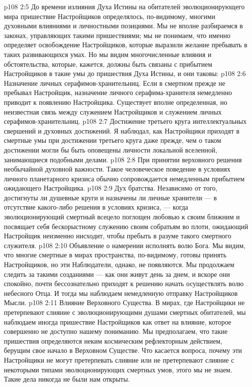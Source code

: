\vs p108 2:5 До времени излияния Духа Истины на обитателей эволюционирующего мира пришествие Настройщиков определялось, по\hyp{}видимому, многими духовными влияниями и личностными позициями. Мы не вполне разбираемся в законах, управляющих такими пришествиями; мы не понимаем, что именно определяет освобождение Настройщиков, которые выразили желание пребывать в таких развивающихся умах. Но мы видим многочисленные влияния и обстоятельства, которые, кажется, должны быть связаны с прибытием Настройщиков в такие умы до пришествия Духа Истины, и они таковы:
\vs p108 2:6 \bibnobreakspace Назначение личных серафимов\hyp{}хранительниц. Если в смертном прежде не пребывал Настройщик, назначение личного серафима\hyp{}хранителя немедленно приводит к появлению Настройщика. Существует вполне определенная, но неизвестная связь между служением Настройщиков и служением личных серафимов\hyp{}хранительниц.
\vs p108 2:7 \bibnobreakspace Достижение третьего круга интеллектуальных свершений и духовных достижений. Я наблюдал, как Настройщики приходят в смертные умы при достижении третьего круга даже прежде, чем о таком достижении могли бы быть оповещены личности локальной вселенной, занимающиеся подобными делами.
\vs p108 2:8 \bibnobreakspace При принятии верховного решения необычайной духовной важности. Такое человеческое поведение в условиях личного планетарного кризиса обычно сопровождается немедленным прибытием ожидающего Настройщика.
\vs p108 2:9 \bibnobreakspace Дух братства. Независимо от того, достигнуты ли душевные круги и назначены ли личные хранители --- в отсутствие какого\hyp{}либо решения в условиях кризиса, --- когда эволюционирующий смертный всецело поглощен любовью к своим ближним и посвящает себя бескорыстному служению своим собратьям во плоти, ожидающий Настройщик неизменно нисходит, чтобы пребыть в разуме такого смертного служителя.
\vs p108 2:10 \bibnobreakspace Объявление о намерении исполнять волю Бога. Мы видим, что многие смертные в мирах пространства, по\hyp{}видимому, готовы принять Настройщиков, но эти Наблюдатели, однако, не появляются. Мы продолжаем следить за такими созданиями --- как они живут день за днем, и вскоре они спокойно, почти бессознательно приходят к решению начать осуществлять волю небесного Отца. И тогда мы наблюдаем немедленную отправку Настройщиков Мысли.
\vs p108 2:11 \bibnobreakspace Влияние Верховного Существа. В мирах, где Настройщики не претерпевают слияние с эволюционирующими душами смертных обитателей, мы наблюдаем иногда пришествие Настройщиков как ответ на влияние, которое совершенно не доступно нашему пониманию. Мы предполагаем, что такие пришествия определяются неким космическим рефлекторным действием, берущим свое начало в Верховном Существе. Что касается вопроса, почему эти Настройщики не могут претерпевать слияние или не претерпевают слияние с некоторыми типами эволюционирующих смертных умов, этого мы не знаем. Такие дела никогда не были нам открыты.
